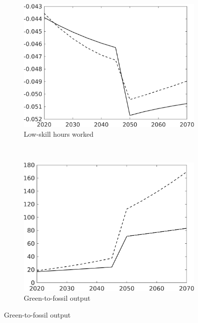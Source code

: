 \begin{figure}[h!!!]
\vspace{3mm}
	\begin{subfigure}[]{0.4\textwidth}
		\caption{Low-skill hours worked}
		\includegraphics[width=1\textwidth]{../../codding_model/own_basedOnFried/optimalPol_010922_revision/figures/all_13Sept22_Tplus30/hl_PercentageLFDyn_Target_regime4_knspil0_spillover0_noskill0_sep0_xgrowth0_PV1_etaa0.79_lgd0.png}
	\end{subfigure}
\begin{minipage}[]{0.1\textwidth}
	\ 
\end{minipage}
\begin{subfigure}[]{0.4\textwidth}
\caption{Green-to-fossil output}
\includegraphics[width=1\textwidth]{../../codding_model/own_basedOnFried/optimalPol_010922_revision/figures/all_13Sept22_Tplus30/GFF_PercentageLFDyn_Target_regime4_knspil0_spillover0_noskill0_sep0_xgrowth0_PV1_etaa0.79_lgd0.png}
\end{subfigure}


\end{figure}

